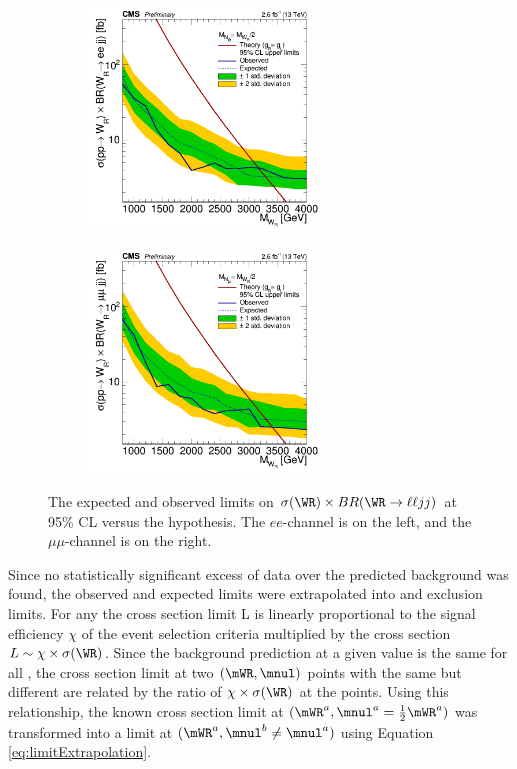 \begin{figure}
	\centering
	\begin{subfigure}[t]{2.4in}
		\centering
		\includegraphics[width=2.4in]{figures/limWReejj_SHv19700toysAprilTwentyThree.png}
	\end{subfigure}
	\thickspace
	\begin{subfigure}[t]{2.4in}
		\centering
		\includegraphics[width=2.4in]{figures/limWRmumujj_SHv19700toysAprilTwentyThree.png}
	\end{subfigure}
	\caption{The expected and observed limits on $\sigma(\WR) \times BR(\WR \rightarrow \ell\ell jj)$ at 95\% CL versus the \mWR 
		hypothesis.  The $ee$-channel is on the left, and the $\mu\mu$-channel is on the right.}
	\label{fig:oneDimLimits}
\end{figure}

Since no statistically significant excess of data over the predicted background was found, the observed and expected limits 
were extrapolated into \mnul and \mWR exclusion limits.  For any \mnul the cross section limit L is linearly proportional to the signal 
efficiency $\chi$ of the event selection criteria multiplied by the \WR cross section $L \sim \chi \times \sigma(\WR)$.  Since 
the background prediction at a given \mWR value is the same for all \mnul, the cross section limit at two $(\mWR,\mnul)$ points 
with the same \mWR but different \mnul are related by the ratio of $\chi \times \sigma(\WR)$ at the points.  Using this relationship, 
the known cross section limit at $(\mWR^{a}, \mnul^{a} = \frac{1}{2}\mWR^{a})$ was transformed into a limit at 
$(\mWR^{a}, \mnul^{b} \neq \mnul^{a})$ using Equation \ref{eq:limitExtrapolation}.


